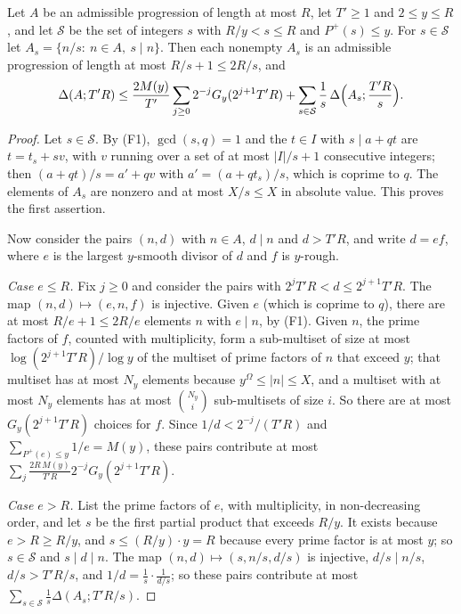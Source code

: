 \begin{lemma}\label{lem:one-step}
Let $A$ be an admissible progression of length at most $R$, let $T'\ge1$ and $2\le y\le R$, and let $\mathcal{S}$ be
the set of integers $s$ with $R/y<s\le R$ and $P^+(s)\le y$. For $s\in\mathcal{S}$ let
$A_s=\{n/s:\ n\in A,\ s\mid n\}$. Then each nonempty $A_s$ is an admissible progression of length at most
$R/s+1\le2R/s$, and
\[
\Delta(A;T'R)\le\frac{2M(y)}{T'}\sum_{j\ge0}2^{-j}G_y(2^{j+1}T'R)+\sum_{s\in\mathcal{S}}\frac1s\,
\Delta\Bigl(A_s;\frac{T'R}{s}\Bigr).
\]
\end{lemma}

\begin{proof}
Let $s\in\mathcal{S}$. By (F1), $\gcd(s,q)=1$ and the $t\in I$ with $s\mid a+qt$ are $t=t_s+sv$, with $v$ running over
a set of at most $|I|/s+1$ consecutive integers; then $(a+qt)/s=a'+qv$ with $a'=(a+qt_s)/s$, which is coprime to $q$.
The elements of $A_s$ are nonzero and at most $X/s\le X$ in absolute value. This proves the first assertion.

Now consider the pairs $(n,d)$ with $n\in A$, $d\mid n$ and $d>T'R$, and write $d=ef$, where $e$ is the largest
$y$-smooth divisor of $d$ and $f$ is $y$-rough.

\emph{Case $e\le R$.} Fix $j\ge0$ and consider the pairs with $2^jT'R<d\le2^{j+1}T'R$. The map
$(n,d)\mapsto(e,n,f)$ is injective. Given $e$ (which is coprime to $q$), there are at most $R/e+1\le2R/e$ elements $n$
with $e\mid n$, by (F1). Given $n$, the prime factors of $f$, counted with multiplicity, form a sub-multiset of size
at most $\log(2^{j+1}T'R)/\log y$ of the multiset of prime factors of $n$ that exceed $y$; that multiset has at most
$N_y$ elements because $y^\Omega\le|n|\le X$, and a multiset with at most $N_y$ elements has at most
$\binom{N_y}{i}$ sub-multisets of size $i$. So there are at most $G_y(2^{j+1}T'R)$ choices for $f$. Since
$1/d<2^{-j}/(T'R)$ and $\sum_{P^+(e)\le y}1/e=M(y)$, these pairs contribute at most
$\sum_j\frac{2R\,M(y)}{T'R}2^{-j}G_y(2^{j+1}T'R)$.

\emph{Case $e>R$.} List the prime factors of $e$, with multiplicity, in non-decreasing order, and let $s$ be the first
partial product that exceeds $R/y$. It exists because $e>R\ge R/y$, and $s\le(R/y)\cdot y=R$ because every prime factor
is at most $y$; so $s\in\mathcal{S}$ and $s\mid d\mid n$. The map $(n,d)\mapsto(s,n/s,d/s)$ is injective,
$d/s\mid n/s$, $d/s>T'R/s$, and $1/d=\frac1s\cdot\frac1{d/s}$; so these pairs contribute at most
$\sum_{s\in\mathcal{S}}\frac1s\Delta(A_s;T'R/s)$.
\end{proof}


